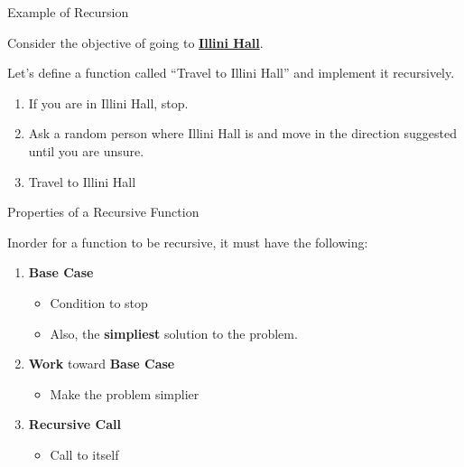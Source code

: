 \begin{frame}{Example of Recursion}

Consider the objective of going to
\href{https://www.google.com/maps/place/Illini+Hall,+725+S+Wright+St,+Champaign,+IL+61820/@40.1094428,-88.2314462,17z/data=!3m1!4b1!4m5!3m4!1s0x880cd73f088353ff:0x8d73968b31810cf9!8m2!3d40.1094428!4d-88.2292575}{\textbf{Illini
Hall}}.

Let's define a function called ``Travel to Illini Hall'' and implement
it recursively.

\begin{enumerate}
\def\labelenumi{\arabic{enumi}.}
\tightlist
\item
  If you are in Illini Hall, stop.
\item
  Ask a random person where Illini Hall is and move in the direction
  suggested until you are unsure.
\item
  Travel to Illini Hall
\end{enumerate}

\end{frame}

\begin{frame}{Properties of a Recursive Function}

Inorder for a function to be recursive, it must have the following:

\begin{enumerate}
\def\labelenumi{\arabic{enumi}.}
\tightlist
\item
  \textbf{Base Case}

  \begin{itemize}
  \tightlist
  \item
    Condition to stop
  \item
    Also, the \textbf{simpliest} solution to the problem.
  \end{itemize}
\item
  \textbf{Work} toward \textbf{Base Case}

  \begin{itemize}
  \tightlist
  \item
    Make the problem simplier
  \end{itemize}
\item
  \textbf{Recursive Call}

  \begin{itemize}
  \tightlist
  \item
    Call to itself
  \end{itemize}
\end{enumerate}

\end{frame}

